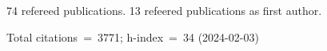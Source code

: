 74 refereed publications. 13 refeered publications as first author.

Total citations~=~3771; h-index~=~34 (2024-02-03)